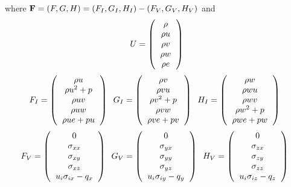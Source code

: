 where ${\bf F} = (F,G,H) = (F_I,G_I,H_I) - (F_V,G_V,H_V)$ and
\begin{equation}
U = \l(
\begin{tabular}{c}
$\rho$\\
$\rho u$\\
$\rho v$\\
$\rho w$\\
$\rho e$
\end{tabular}
\r) 
\end{equation}
\begin{equation}
F_I = \l(
\begin{tabular}{c}
$\rho u$\\
$\rho u^2 + p$\\
$\rho uv$\\
$\rho uw$\\
$\rho ue + pu$
\end{tabular}
\r) \;\; 
G_I = \l(
\begin{tabular}{c}
$\rho v$\\
$\rho vu$\\
$\rho v^2 + p$\\
$\rho vw$\\
$\rho ve+pv$
\end{tabular}
\r) \;\; 
H_I = \l(
\begin{tabular}{c}
$\rho w$\\
$\rho wu$\\
$\rho wv$\\
$\rho w^2 + p$\\
$\rho we + pw$
\end{tabular}
\r) \;\; 
\end{equation}
\begin{equation}
F_V = \l(
\begin{tabular}{c}
$0$\\
$\sigma_{xx}$\\
$\sigma_{xy}$\\
$\sigma_{xz}$\\
$u_i\sigma_{ix}-q_x$
\end{tabular}
\r) \;\; 
G_V = \l(
\begin{tabular}{c}
$0$\\
$\sigma_{yx}$\\
$\sigma_{yy}$\\
$\sigma_{yz}$\\
$u_i\sigma_{iy}-q_y$
\end{tabular}
\r) \;\; 
H_V = \l(
\begin{tabular}{c}
$0$\\
$\sigma_{zx}$\\
$\sigma_{zy}$\\
$\sigma_{zz}$\\
$u_i\sigma_{iz}-q_z$
\end{tabular}
\r) \;\; 
\end{equation}

